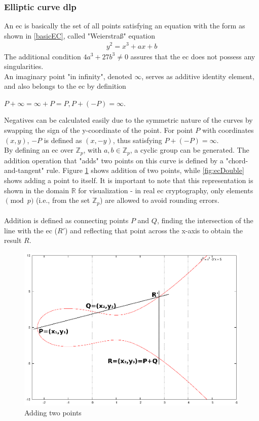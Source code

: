 \subsubsection{Elliptic curve \gls{dlp}}\label{sec:ecIntro}
An \gls{ec} is basically the set of all points
satisfying an equation with the form as shown in \ref{basicEC}, called "Weierstraß" equation
\begin{align}\label{basicEC}
 y^2 = x^3 + ax +b
\end{align}
The additional condition $4a^3 + 27b^3 \neq 0$ assures that the \gls{ec} does not possess any singularities.
\\
An imaginary point "in infinity", denoted $\infty$, serves as additive identity element, and also belongs to the \gls{ec} by definition
\begin{center}
 $P + \infty = \infty + P = P, P + (-P) = \infty$.
\end{center}
Negatives can be calculated easily due to the symmetric nature of the curves by swapping the sign of the y-coordinate of the point. For point $P$ with coordinates $(x, y)$, $-P$ is defined as
$(x,-y)$, thus satisfying $P + (-P) = \infty$.
\\
By defining an \gls{ec} over $\mathbb{Z}_p$, with $a, b \in \mathbb{Z}_p$, a cyclic group can be generated. The addition operation that "adds" two points on
this curve is defined by a "chord-and-tangent" rule. Figure \ref{fig:ecAdd}
shows addition of two points, while \ref{fig:ecDouble} shows adding a point to itself. It is important to note that this representation is shown in the domain
$\mathbb{R}$ for visualization - in real \gls{ec} cryptography, only elements $\pmod p$ (i.e., from the set $\mathbb{Z}_p$)
are allowed to avoid rounding errors. 
\\
\\
Addition is defined as connecting points $P$ and 
$Q$, finding the intersection of the line with the \gls{ec} ($R'$) and reflecting that point across the x-axis to obtain the result $R$. 
          \begin{figure}[H]
          \centering
              \includegraphics[width=0.6\linewidth]{figures/ecAdd.eps}
              \caption{Adding two points}
              \label{fig:ecAdd}
          \end{figure}
